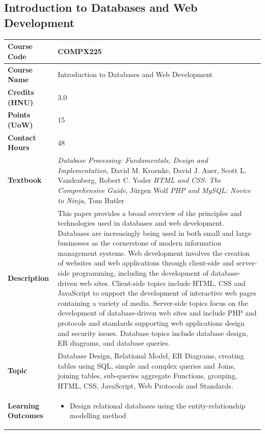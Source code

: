 \documentclass{article}
\begin{document}
\subsection[COMPX225 Introduction to Databases and Web Development]{Introduction to Databases and Web Development}
\renewcommand{\arraystretch}{1.5} %
\begin{longtable}{|p{3cm}|p{10cm}|}
\hline
\textbf{Course Code} & COMPX225 \\
\hline
\textbf{Course Name} & Introduction to Databases and Web Development \\
\hline
\textbf{Credits (HNU)} & 3.0 \\
\hline
\textbf{Points (UoW)} & 15 \\
\hline
\textbf{Contact Hours} & 48 \\
\hline
\textbf{Textbook} & \emph{Database Processing: Fundamentals, Design and Implementation}, David M. Kroenke, David J. Auer, Scott L. Vandenberg, Robert C. Yoder \newline 
                    \emph{HTML and CSS: The Comprehensive Guide}, Jürgen Wolf \newline
                    \emph{PHP and MySQL: Novice to Ninja}, Tom Butler\\
\hline
\textbf{Description} & This paper provides a broad overview of the principles and technologies used in databases and web development. Databases are increasingly being used in both small and large businesses as the cornerstone of modern information management systems. Web development involves the creation of websites and web applications through client-side and server-side programming, including the development of database-driven web sites. Client-side topics include HTML, CSS and JavaScript to support the development of interactive web pages containing a variety of media. Server-side topics focus on the development of database-driven web sites and include PHP and protocols and standards supporting web applications design and security issues. Database topics include database design, ER diagrams, and database queries.\\
\hline
\textbf{Topic} & Database Design, 
Relational Model, 
ER Diagrams, 
creating tables using SQL, 
simple and complex queries and Joins,
joining tables, 
sub-queries
aggregate Functions,
grouping, 
HTML, 
CSS, 
JavaScript, 
Web Protocols and Standards.\\
\hline
\textbf{Learning Outcomes} & 
    \begin{itemize}
        \item Design relational databases using the entity-relationship modelling method

\end{itemize}
\end{longtable}
\end{document}
